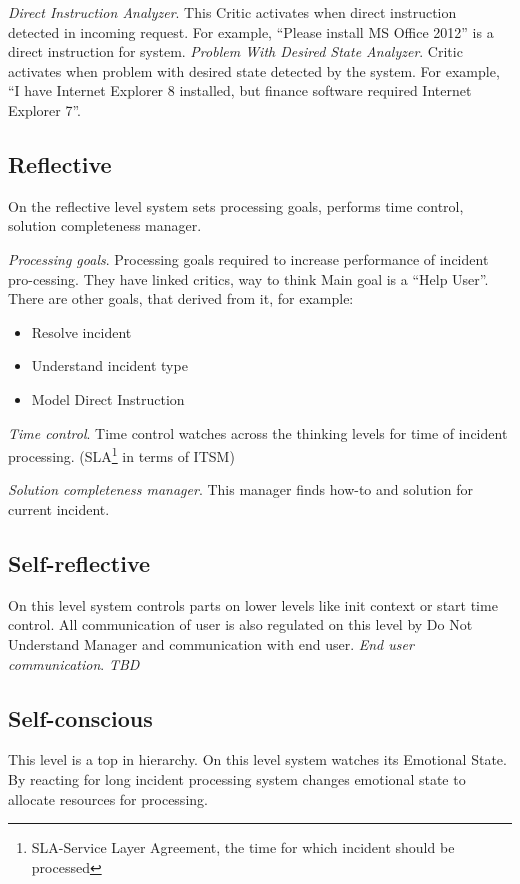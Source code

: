 \documentclass[12pt]{article}
\begin{document}
\emph{Direct Instruction Analyzer}. This Critic activates when direct instruction detected in incoming request. For example, “Please install MS Office 2012” is a direct instruction for system.
\emph{Problem With Desired State Analyzer}. Critic activates when problem with desired state detected by the system. For example, “I have Internet Explorer 8 installed, but finance software required Internet Explorer 7”.

\subsection{Reflective}

On the reflective level system sets processing goals, performs time control, solution completeness manager.

\emph{Processing goals}. Processing goals required to increase performance of incident pro-cessing. They have linked critics, way to think Main goal is a “Help User”. There are other goals, that derived from it, for example:
\begin{itemize}
 \item Resolve incident
 \item Understand incident type
 \item Model Direct Instruction
\end{itemize}

\emph{Time control}. Time control watches across the thinking levels for time of incident processing. (SLA\footnote{SLA-Service Layer Agreement, the time for which incident should be processed} in terms of ITSM)

\emph{Solution completeness manager}. This manager finds how-to and solution for current incident.

\subsection{Self-reflective}
On this level system controls parts on lower levels like init context or start time control. All communication of user is also regulated on this level by Do Not Understand Manager and communication with end user.
\emph{End user communication}. \emph{TBD}

\subsection{Self-conscious}
This level is a top in hierarchy. On this level system watches its Emotional State. By reacting for long incident processing system changes emotional state to allocate resources for processing.
\end{document}

